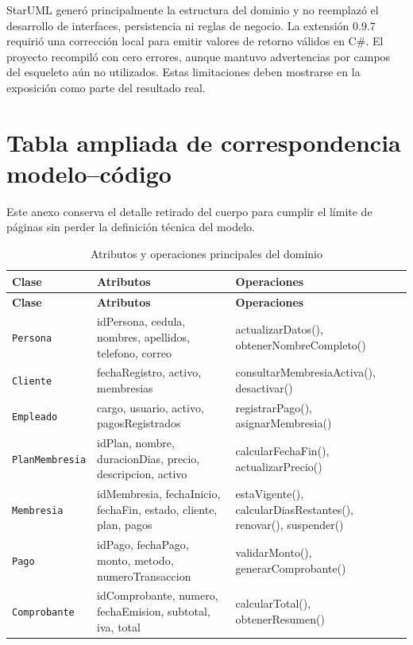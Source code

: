 \documentclass[12pt,a4paper]{article}
\begin{document}
StarUML generó principalmente la estructura del dominio y no reemplazó el
desarrollo de interfaces, persistencia ni reglas de negocio. La extensión
0.9.7 requirió una corrección local para emitir valores de retorno válidos en
C\#. El proyecto recompiló con cero errores, aunque mantuvo advertencias por
campos del esqueleto aún no utilizados. Estas limitaciones deben mostrarse en
la exposición como parte del resultado real.


\renewcommand{\refname}{Referencias bibliográficas}


\clearpage
\appendix

\section{Tabla ampliada de correspondencia modelo--código}
\label{anexo:correspondencia}

Este anexo conserva el detalle retirado del cuerpo para cumplir el límite de
páginas sin perder la definición técnica del modelo.

\footnotesize
\begin{longtable}{>{\raggedright\arraybackslash}p{3.1cm}
                  >{\raggedright\arraybackslash}p{5cm}
                  >{\raggedright\arraybackslash}p{6cm}}
\caption{Atributos y operaciones principales del dominio}\\
\toprule
\textbf{Clase} & \textbf{Atributos} & \textbf{Operaciones} \\
\midrule
\endfirsthead
\toprule
\textbf{Clase} & \textbf{Atributos} & \textbf{Operaciones} \\
\midrule
\endhead
\texttt{Persona} & idPersona, cedula, nombres, apellidos, telefono, correo & actualizarDatos(), obtenerNombreCompleto() \\
\texttt{Cliente} & fechaRegistro, activo, membresias & consultarMembresiaActiva(), desactivar() \\
\texttt{Empleado} & cargo, usuario, activo, pagosRegistrados & registrarPago(), asignarMembresia() \\
\texttt{PlanMembresia} & idPlan, nombre, duracionDias, precio, descripcion, activo & calcularFechaFin(), actualizarPrecio() \\
\texttt{Membresia} & idMembresia, fechaInicio, fechaFin, estado, cliente, plan, pagos & estaVigente(), calcularDiasRestantes(), renovar(), suspender() \\
\texttt{Pago} & idPago, fechaPago, monto, metodo, numeroTransaccion & validarMonto(), generarComprobante() \\
\texttt{Comprobante} & idComprobante, numero, fechaEmision, subtotal, iva, total & calcularTotal(), obtenerResumen() \\
\bottomrule
\end{longtable}
\normalsize
\end{document}
